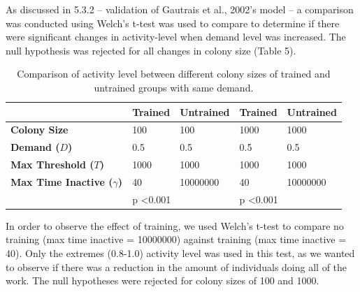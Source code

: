 \documentclass[a4paper]{article}
\begin{document}
As discussed in 5.3.2 – validation of Gautrais et al., 2002’s model – a comparison was conducted using Welch’s t-test was used to compare to determine if there were significant changes in activity-level when demand level was increased.  The null hypothesis was rejected for all changes in colony size (Table 5).

\begin{table}[H]
\caption{Comparison of activity level between different colony sizes of trained and untrained groups with same demand.}
\begin{tabular}{|l|l|l|l|l|}
\hline
                           & \textbf{Trained}  & \textbf{Untrained} & \textbf{Trained}  & \textbf{Untrained} \\ \hline
\textbf{Colony Size}       & 100               & 100                & 1000              & 1000               \\ \hline
\textbf{Demand ($D$)}            & 0.5               & 0.5                & 0.5               & 0.5                \\ \hline
\textbf{Max Threshold ($T$)}     & 1000              & 1000               & 1000              & 1000               \\ \hline
\textbf{Max Time Inactive ($\gamma$)} & 40                & 10000000           & 40                & 10000000           \\ \hline
                           & \multicolumn{2}{l|}{p \textless 0.001} & \multicolumn{2}{l|}{p \textless 0.001} \\ \hline
\end{tabular}
\end{table}

In order to observe the effect of training, we used Welch’s t-test to compare no training (max time inactive = 10000000) against training (max time inactive = 40).  Only the extremes (0.8-1.0) activity level was used in this test, as we wanted to observe if there was a reduction in the amount of individuals doing all of the work.  The null hypotheses were rejected for colony sizes of 100 and 1000. 
\end{document}
